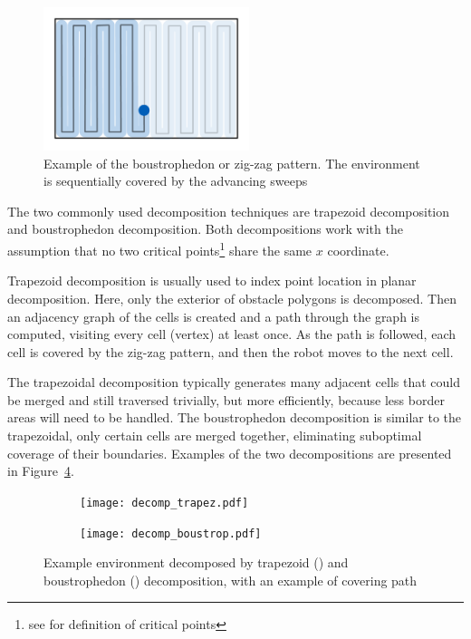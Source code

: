 \documentclass[buriama8_dp.tex]{subfiles}
\begin{document}
\begin{figure}[ht]
  \centering
  \includegraphics[width=6cm]{figures/zigzag.pdf}
  \caption[Boustrophedon pattern]{Example of the boustrophedon or zig-zag pattern. The environment is sequentially covered by the advancing sweeps}
  \label{fig:zig_pattern}
\end{figure}

The two commonly used decomposition techniques are trapezoid decomposition and boustrophedon decomposition. Both decompositions work with the assumption that no two critical points\footnote{see \cite{optimalcoverage} for definition of critical points} share the same \(x\) coordinate.

Trapezoid decomposition is usually used to index point location in planar decomposition. Here, only the exterior of obstacle polygons is decomposed. Then an adjacency graph of the cells is created and a path through the graph is computed, visiting every cell (vertex) at least once. As the path is followed, each cell is covered by the zig-zag pattern, and then the robot moves to the next cell. 

The trapezoidal decomposition typically generates many adjacent cells that could be merged and still traversed trivially, but more efficiently, because less border areas will need to be handled. The boustrophedon decomposition is similar to the trapezoidal, only certain cells are merged together, eliminating suboptimal coverage of their boundaries. Examples of the two decompositions are presented in Figure~\ref{fig:decomps}.

\begin{figure}[ht]
  \begin{subfigure}[t]{0.4\textwidth}
    \texttt{[image: decomp\_trapez.pdf]}
    \caption{}
    \label{fig:decomp_trapez}
  \end{subfigure}
  \begin{subfigure}[t]{0.4\textwidth}
    \texttt{[image: decomp\_boustrop.pdf]}
    \caption{}
    \label{fig:decomp_boustrop}
  \end{subfigure}

  \caption[Trapezoid and boustrophedon decompositions]{Example environment decomposed by trapezoid () and boustrophedon () decomposition, with an example of covering path}
  \label{fig:decomps}
\end{figure}
\end{document}
